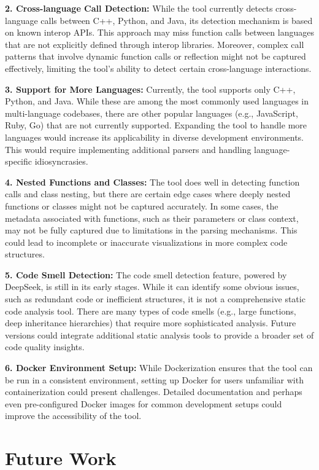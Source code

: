 \documentclass[10pt,twocolumn]{article}
\begin{document}
\textbf{2. Cross-language Call Detection:}  
While the tool currently detects cross-language calls between C++, Python, and Java, its detection mechanism is based on known interop APIs. This approach may miss function calls between languages that are not explicitly defined through interop libraries. Moreover, complex call patterns that involve dynamic function calls or reflection might not be captured effectively, limiting the tool's ability to detect certain cross-language interactions.

\textbf{3. Support for More Languages:}  
Currently, the tool supports only C++, Python, and Java. While these are among the most commonly used languages in multi-language codebases, there are other popular languages (e.g., JavaScript, Ruby, Go) that are not currently supported. Expanding the tool to handle more languages would increase its applicability in diverse development environments. This would require implementing additional parsers and handling language-specific idiosyncrasies.

\textbf{4. Nested Functions and Classes:}  
The tool does well in detecting function calls and class nesting, but there are certain edge cases where deeply nested functions or classes might not be captured accurately. In some cases, the metadata associated with functions, such as their parameters or class context, may not be fully captured due to limitations in the parsing mechanisms. This could lead to incomplete or inaccurate visualizations in more complex code structures.

\textbf{5. Code Smell Detection:}  
The code smell detection feature, powered by DeepSeek, is still in its early stages. While it can identify some obvious issues, such as redundant code or inefficient structures, it is not a comprehensive static code analysis tool. There are many types of code smells (e.g., large functions, deep inheritance hierarchies) that require more sophisticated analysis. Future versions could integrate additional static analysis tools to provide a broader set of code quality insights.

\textbf{6. Docker Environment Setup:}  
While Dockerization ensures that the tool can be run in a consistent environment, setting up Docker for users unfamiliar with containerization could present challenges. Detailed documentation and perhaps even pre-configured Docker images for common development setups could improve the accessibility of the tool.

\section{Future Work}
\end{document}
